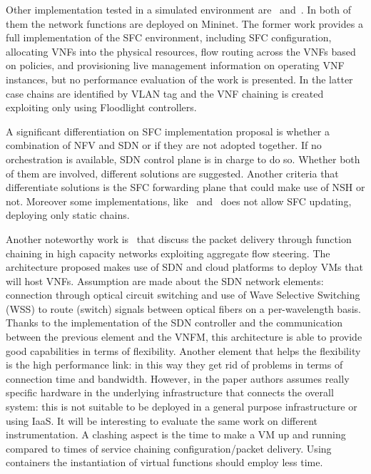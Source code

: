 Other implementation tested in a simulated environment
are~\cite{csoma2014escape} and~\cite{kim2016evaluations}. In both of them the
network functions are deployed on Mininet. The former work provides a full
implementation of the SFC environment, including SFC configuration, allocating
VNFs into the physical resources, flow routing across the VNFs based on
policies, and provisioning live management information on operating VNF
instances, but no performance evaluation of the work is presented. In the latter
case chains are identified by VLAN tag and the VNF chaining is created
exploiting only using Floodlight controllers.

A significant differentiation on SFC implementation proposal is whether a
combination of NFV and SDN or if they are not adopted together. If no
orchestration is available, SDN control plane is in charge to do so. Whether
both of them are involved, different solutions are suggested. Another criteria
that differentiate solutions is the SFC forwarding plane that could make use of
NSH or not. Moreover some implementations, like~\cite{soares2015toward}
and~\cite{abujoda2015midas} does not allow SFC updating, deploying only static
chains.

Another noteworthy work is~\cite{xia2015optical} that discuss the packet
delivery through function chaining in high capacity networks exploiting
aggregate flow steering. The architecture proposed makes use of SDN and cloud
platforms to deploy VMs that will host VNFs. Assumption are made about the SDN
network elements: connection through optical circuit switching and use of Wave
Selective Switching (WSS) to route (switch) signals between optical fibers on a
per-wavelength basis. Thanks to the implementation of the SDN controller and the
communication between the previous element and the VNFM, this architecture is
able to provide good capabilities in terms of flexibility. Another element that
helps the flexibility is the high performance link: in this way they get rid of
problems in terms of connection time and bandwidth. However, in the paper
authors assumes really specific hardware in the underlying infrastructure that
connects the overall system: this is not suitable to be deployed in a general
purpose infrastructure or using IaaS. It will be interesting to evaluate the
same work on different instrumentation. A clashing aspect is the time to make a
VM up and running compared to times of service chaining configuration/packet
delivery. Using containers the instantiation of virtual functions should employ
less time.

